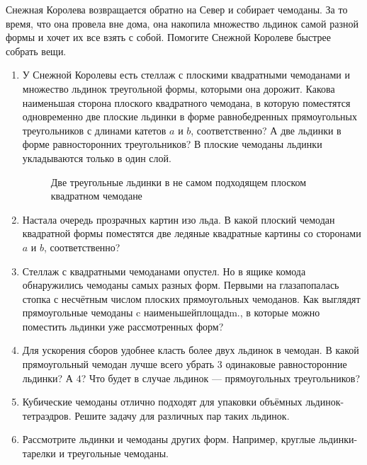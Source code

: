 \newcommand{\mb}[1]{\mathbb{#1}}
\newcommand{\conv}{\operatorname{conv}}

Снежная Королева возвращается обратно на Север и собирает чемоданы. За то время, что она провела вне дома, она накопила множество льдинок самой разной формы и хочет их все взять с собой. Помогите Снежной Королеве быстрее собрать вещи.

\begin{enumerate}
\item У Снежной Королевы есть стеллаж с плоскими квадратными чемоданами и множество льдинок треугольной формы, которыми она дорожит. Какова наименьшая сторона плоского квадратного чемодана, в которую поместятся одновременно две плоские льдинки в форме равнобедренных прямоугольных треугольников с длинами катетов $a$ и $b$, соответственно? А две льдинки в форме равносторонних треугольников? В плоские чемоданы льдинки укладываются только в один слой.
\begin{figure}[h]
\begin{center}
\end{center}
\caption{Две треугольные льдинки в не самом подходящем плоском квадратном чемодане}
\end{figure}
\item Настала очередь прозрачных картин изо льда. В какой плоский чемодан квадратной формы поместятся две ледяные квадратные картины со сторонами $a$ и $b$, соответственно?
\item Стеллаж с квадратными чемоданами опустел. Но в ящике комода обнаружились чемоданы самых разных форм. Первыми на глаза\linebreak попалась стопка с несчётным числом плоских прямоугольных чемоданов. Как выглядят прямоугольные чемоданы c наименьшей\linebreak площадm., в которые можно поместить льдинки уже рассмотренных форм?
\item Для ускорения сборов удобнее класть более двух льдинок в чемодан. В какой прямоугольный чемодан лучше всего убрать $3$ одинаковые равносторонние льдинки? А $4$? Что будет в случае льдинок --- прямоугольных треугольников?
\item Кубические чемоданы отлично подходят для упаковки объёмных льдинок-тетраэдров. Решите задачу для различных пар таких льдинок.
\item Рассмотрите льдинки и чемоданы других форм. Например, круглые льдинки-тарелки и треугольные чемоданы.
\end{enumerate}


